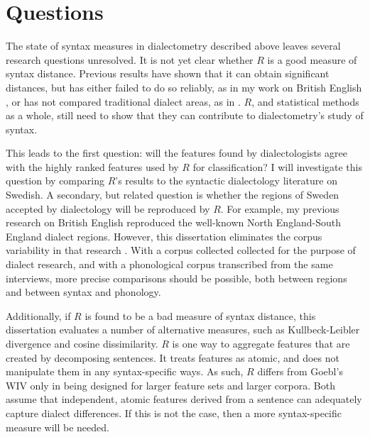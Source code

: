 \chapter{Questions}
The state of syntax measures in dialectometry described above leaves
several research questions unresolved. It is not yet clear whether $R$
is a good measure of syntax distance. Previous results have shown that
it can obtain significant distances, but has either failed to do so
reliably, as in my work on British English \cite{sanders08b}, or has
not compared traditional dialect areas, as in
. $R$, and statistical methods as a whole, still
need to show that they can contribute to dialectometry's study of
syntax.

This leads to the first question: will the features found by
dialectologists agree with the highly ranked features used by $R$ for
classification? I will investigate this question by comparing $R$'s
results to the syntactic dialectology literature on Swedish. A
secondary, but related question is whether the regions of Sweden
accepted by dialectology will be reproduced by $R$. For example, my
previous research on British English reproduced the well-known North
England-South England dialect regions. However, this dissertation
eliminates the corpus variability in that research
\cite{sanders08b}. With a corpus collected collected for the purpose
of dialect research, and with a phonological corpus transcribed from the
same interviews, more precise comparisons should be possible, both
between regions and between syntax and phonology.

Additionally, if $R$ is found to be a bad measure of syntax distance,
this dissertation evaluates a number of alternative
measures, such as Kullbeck-Leibler divergence and cosine
dissimilarity. $R$ is one way to aggregate features that are created
by decomposing sentences. It treats features as atomic, and does not
manipulate them in any syntax-specific ways. As such, $R$ differs from
Goebl's WIV only in being designed for larger feature sets and
larger corpora. Both assume that independent, atomic features derived
from a sentence can adequately capture dialect differences. If this is
not the case, then a more syntax-specific measure will be needed.

